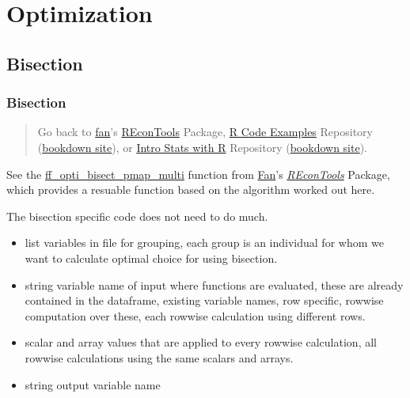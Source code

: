 \documentclass[
]{book}
\providecommand{\tightlist}{%
  \setlength{\itemsep}{0pt}\setlength{\parskip}{0pt}}
\begin{document}
\hypertarget{optimization}{%
\chapter{Optimization}\label{optimization}}

\hypertarget{bisection}{%
\section{Bisection}\label{bisection}}

\hypertarget{bisection-1}{%
\subsection{Bisection}\label{bisection-1}}

\begin{quote}
Go back to \href{http://fanwangecon.github.io/}{fan}'s \href{https://fanwangecon.github.io/REconTools/}{REconTools} Package, \href{https://fanwangecon.github.io/R4Econ/}{R Code Examples} Repository (\href{https://fanwangecon.github.io/R4Econ/bookdown}{bookdown site}), or \href{https://fanwangecon.github.io/Stat4Econ/}{Intro Stats with R} Repository (\href{https://fanwangecon.github.io/Stat4Econ/bookdown}{bookdown site}).
\end{quote}

See the \href{https://fanwangecon.github.io/REconTools/reference/ff_opti_bisect_pmap_multi.html}{ff\_opti\_bisect\_pmap\_multi} function from \href{https://fanwangecon.github.io/}{Fan}'s \emph{\href{https://fanwangecon.github.io/REconTools/}{REconTools}} Package, which provides a resuable function based on the algorithm worked out here.

The bisection specific code does not need to do much.

\begin{itemize}
\tightlist
\item
  list variables in file for grouping, each group is an individual for whom we want to calculate optimal choice for using bisection.
\item
  string variable name of input where functions are evaluated, these are already contained in the dataframe, existing variable names, row specific, rowwise computation over these, each rowwise calculation using different rows.
\item
  scalar and array values that are applied to every rowwise calculation, all rowwise calculations using the same scalars and arrays.
\item
  string output variable name
\end{itemize}
\end{document}
